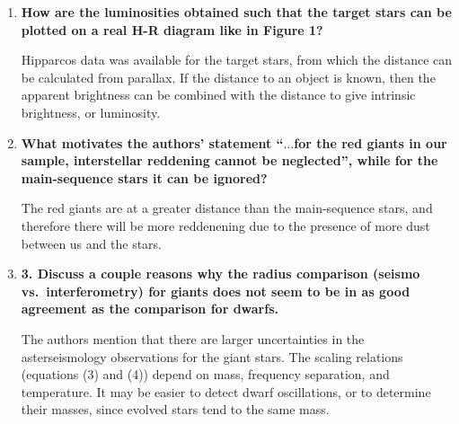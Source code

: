 \documentclass[11pt]{article}
\begin{document}
\begin{enumerate}
    \item \textbf{How are the luminosities obtained such that the target
        stars can be plotted on a real H-R diagram like in Figure 1?}

        Hipparcos data was available for the target stars, from which
        the distance can be calculated from parallax. If the distance
        to an object is known, then the apparent brightness can be
        combined with the distance to give intrinsic brightness, or
        luminosity.


    \item \textbf{What motivates the authors' statement ``$\ldots$for the
        red giants in our sample, interstellar reddening cannot be
        neglected'', while for the main-sequence stars it can be ignored?}

        The red giants are at a greater distance than the
        main-sequence stars, and therefore there will be more
        reddenening due to the presence of more dust between us and
        the stars.

    \item \textbf{3. Discuss a couple reasons why the radius comparison
        (seismo vs.\ interferometry) for giants does not seem to be in
        as good agreement as the comparison for dwarfs.}

        The authors mention that there are larger uncertainties in
        the asterseismology observations for the giant stars.
        The scaling relations (equations (3) and (4)) depend on mass,
        frequency separation, and temperature. It may be easier to
        detect dwarf oscillations, or to determine their masses, since
        evolved stars tend to the same mass.


\end{enumerate}
\end{document}
